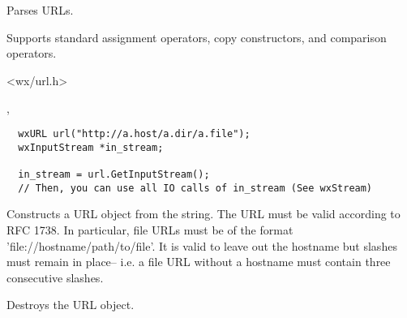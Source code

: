 \section{}\label{wxurl}

Parses URLs.

Supports standard assignment operators, copy constructors,
and comparison operators.




<wx/url.h>


, 


\begin{verbatim}
  wxURL url("http://a.host/a.dir/a.file");
  wxInputStream *in_stream;

  in_stream = url.GetInputStream();
  // Then, you can use all IO calls of in_stream (See wxStream)
\end{verbatim}



\label{wxurlctor}


Constructs a URL object from the string.  The URL must be valid according
to RFC 1738.  In particular, file URLs must be of the format
'file://hostname/path/to/file'.  It is valid to leave out the hostname
but slashes must remain in place-- i.e. a file URL without a hostname must
contain three consecutive slashes.



\label{wxurldtor}


Destroys the URL object.

%
%
\label{wxurlgetprotocolname}

